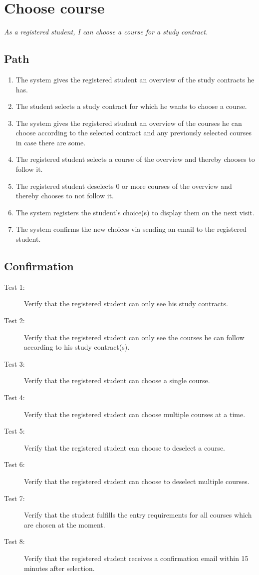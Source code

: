 \section{Choose course}

\par \emph{As a registered student, I can choose a course for a study contract.}

\subsection{Path}

\begin{enumerate}
  \item The system gives the registered student an overview of the study
  contracts he has.
  \item The student selects a study contract for which he wants to choose a
  course.
  \item The system gives the registered student an overview of the courses he
  can choose according to the selected contract and any previously selected courses in case there are some.
  \item The registered student selects a course of the overview and thereby
  chooses to follow it.
  \item The registered student deselects 0 or more courses of the overview and
  thereby chooses to not follow it.
  \item The system registers the student's choice(s) to display them on the next
  visit.
  \item The system confirms the new choices via sending an email to the
  registered student. 
\end{enumerate}

\subsection{Confirmation}

\begin{description}
\item[Test 1:] Verify that the registered student can only see his study
contracts.
\item[Test 2:] Verify that the registered student can only see the courses he
can follow according to his study contract(s).
\item[Test 3:] Verify that the registered student can choose a single course.
\item[Test 4:] Verify that the registered student can choose multiple courses at
a time.
\item[Test 5:] Verify that the registered student can choose to deselect a
course.
\item[Test 6:] Verify that the registered student can choose to deselect
multiple courses.
\item[Test 7:] Verify that the student fulfills the entry requirements for all
courses which are chosen at the moment.
\item[Test 8:] Verify that the registered student receives a confirmation email
within 15 minutes after selection.
\end{description}
